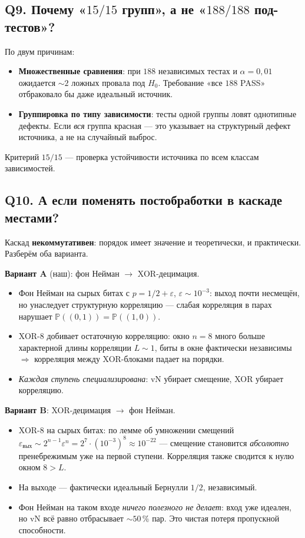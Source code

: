 \documentclass[12pt,a4paper]{extarticle}
\begin{document}
\subsection*{Q9. Почему «$15/15$ групп», а не «$188/188$ под-тестов»?}
По двум причинам:
\begin{itemize}
  \item \textbf{Множественные сравнения}: при $188$ независимых тестах и $\alpha=0{,}01$
        ожидается $\sim 2$ ложных провала под $H_0$. Требование «все $188$ PASS»
        отбраковало бы даже идеальный источник.
  \item \textbf{Группировка по типу зависимости}: тесты одной группы ловят однотипные
        дефекты. Если \emph{вся} группа красная --- это указывает на структурный дефект
        источника, а не на случайный выброс.
\end{itemize}
Критерий $15/15$ --- проверка устойчивости источника по всем классам зависимостей.

\subsection*{Q10. А если поменять постобработки в каскаде местами?}
Каскад \textbf{некоммутативен}: порядок имеет значение и теоретически, и
практически. Разберём оба варианта.

\medskip
\textbf{Вариант A} (наш): фон Нейман $\to$ XOR-децимация.
\begin{itemize}
  \item Фон Нейман на сырых битах с $p = 1/2 + \varepsilon$, $\varepsilon\sim 10^{-3}$:
        выход почти несмещён, но унаследует структурную корреляцию ---
        слабая корреляция в парах нарушает $\mathbb{P}((0,1))=\mathbb{P}((1,0))$.
  \item XOR-8 добивает остаточную корреляцию: окно $n=8$ много больше
        характерной длины корреляции $L\sim 1$, биты в окне фактически
        независимы $\Rightarrow$ корреляция между XOR-блоками падает на
        порядки.
  \item \emph{Каждая ступень специализирована}: vN убирает смещение,
        XOR убирает корреляцию.
\end{itemize}

\medskip
\textbf{Вариант B}: XOR-децимация $\to$ фон Нейман.
\begin{itemize}
  \item XOR-8 на сырых битах: по лемме об умножении смещений
        $\varepsilon_{\text{вых}} \sim 2^{n-1}\varepsilon^{n} =
        2^{7}\cdot(10^{-3})^{8} \approx 10^{-22}$ --- смещение становится
        \emph{абсолютно} пренебрежимым уже на первой ступени.
        Корреляция также сводится к нулю окном $8 > L$.
  \item На выходе --- фактически идеальный Бернулли $1/2$, независимый.
  \item Фон Нейман на таком входе \emph{ничего полезного не делает}:
        вход уже идеален, но vN всё равно отбрасывает $\sim 50\,\%$ пар.
        Это чистая потеря пропускной способности.
\end{itemize}
\end{document}
